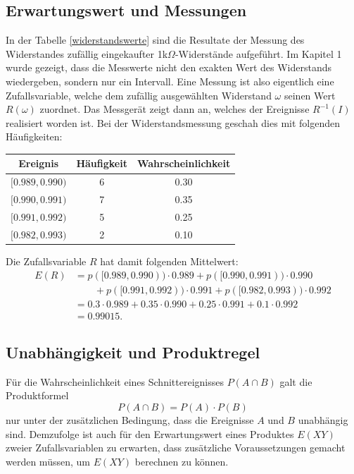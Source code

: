 \subsection{Erwartungswert und Messungen} \label{erwartungswertvonmesswerten}
In der Tabelle \ref{widerstandswerte} sind die Resultate der Messung des
Widerstandes zufällig eingekaufter 1k$\Omega$-Widerstände aufgeführt.
Im Kapitel 1 wurde gezeigt, dass die Mess\-werte nicht den exakten Wert
des Widerstands wiedergeben, sondern nur ein Intervall.
Eine Messung ist
also eigentlich eine Zufallsvariable, welche dem zufällig ausgewählten
Widerstand $\omega$ seinen Wert $R(\omega)$ zuordnet.
Das Messgerät zeigt
dann an, welches der Ereignisse $R^{-1}(I)$ realisiert worden ist.
Bei der Widerstandsmessung geschah dies mit folgenden Häufigkeiten:
\begin{center}
\begin{tabular}{|c|c|c|}
\hline
Ereignis&Häufigkeit&Wahrscheinlichkeit\\
\hline
$[0.989,0.990)$&6&0.30\\
$[0.990,0.991)$&7&0.35\\
$[0.991,0.992)$&5&0.25\\
$[0.982,0.993)$&2&0.10\\
\hline
\end{tabular}
\end{center}
Die Zufallsvariable $R$ hat damit folgenden Mittelwert:
\begin{align*}
E(R)&=p([0.989,0.990))\cdot 0.989+
p([0.990,0.991))\cdot 0.990\\
&\qquad  +
p([0.991,0.992))\cdot 0.991+
p([0.982,0.993))\cdot 0.992\\
&=
0.3\cdot 0.989+
0.35\cdot 0.990+
0.25\cdot 0.991+
0.1\cdot 0.992\\
&=0.99015.
\end{align*}

\subsection{Unabhängigkeit und Produktregel}
Für die Wahrscheinlichkeit eines Schnittereignisses $P(A\cap B)$ galt die
Produktformel
\[
P(A\cap B)=P(A)\cdot P(B)
\]
nur unter der zusätzlichen Bedingung, dass die Ereignisse $A$ und $B$
unabhängig sind.
Demzufolge ist auch für den Erwartungswert eines
Produktes $E(XY)$ zweier Zufallsvariablen zu erwarten, dass zusätzliche
Voraussetzungen gemacht werden müssen, um $E(XY)$ berechnen zu können.

